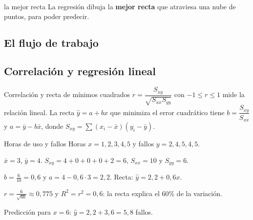 \begin{tmconcepto}{la mejor recta}
La regresi\'on dibuja la \textbf{mejor recta} que atraviesa una nube de puntos, para poder predecir.
\end{tmconcepto}


\subsection{El flujo de trabajo}
\begin{center}
\end{center}

\subsection{Correlaci\'on y regresi\'on lineal}
\begin{tmdef}{Correlaci\'on y recta de m\'inimos cuadrados}
$r=\dfrac{S_{xy}}{\sqrt{S_{xx}S_{yy}}}$ con $-1\le r\le1$ mide la relaci\'on lineal. La recta $\hat y=a+bx$ que minimiza el error cuadr\'atico tiene $b=\dfrac{S_{xy}}{S_{xx}}$ y $a=\bar y-b\bar x$, donde $S_{xy}=\sum(x_i-\bar x)(y_i-\bar y)$.
\end{tmdef}

\begin{tmejemplo}{Horas de uso y fallos}
Horas $x=1, 2, 3, 4, 5$ y fallos $y=2, 4, 5, 4, 5$.
\begin{tmpasos}
\item $\bar x=3$, $\bar y=4$. $S_{xy}=4+0+0+0+2=6$, $S_{xx}=10$ y $S_{yy}=6$.
\item $b=\frac6{10}=0{,}6$ y $a=4-0{,}6\cdot3=2{,}2$. Recta: $\hat y=2{,}2+0{,}6x$.
\item $r=\frac{6}{\sqrt{60}}\approx0{,}775$ y $R^2=r^2=0{,}6$: la recta explica el $60\%$ de la variaci\'on.
\item Predicci\'on para $x=6$: $\hat y=2{,}2+3{,}6=5{,}8$ fallos.
\end{tmpasos}
\end{tmejemplo}

